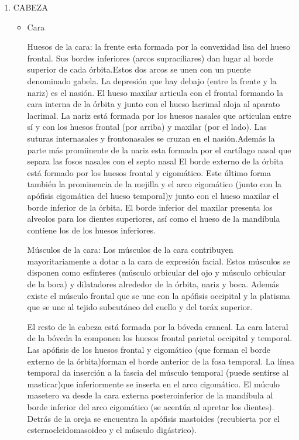 \documentclass[a4paper,12pt]{article} %
\begin{document}
\begin{enumerate} %
\item CABEZA
\begin{itemize} %
\item Cara %

Huesos de la cara: la frente esta formada por la convexidad lisa del hueso frontal. Sus bordes inferiores (arcos supraciliares) dan lugar al borde superior de cada órbita.Estos dos arcos se unen con un puente denominado gabela. La depresión que hay debajo (entre la frente y la nariz) es el nasión.
El hueso maxilar articula con el frontal formando la cara interna de la órbita y junto con el hueso lacrimal aloja al aparato lacrimal.
La nariz  está formada por los huesos nasales que articulan entre sí y con los huesos frontal (por arriba) y maxilar (por el lado). Las suturas internasales y frontonasales se cruzan en el nasión.Además la parte más promiinente de la nariz esta formada por el cartílago nasal que separa las fosos nasales con el septo nasal
El borde externo de la órbita está formado por los huesos frontal y cigomático. Este último forma también la prominencia de la mejilla y el arco cigomático (junto con la apófisis cigomática del hueso temporal)y junto con el hueso maxilar el borde inferior de la órbita.
El borde inferior del maxilar presenta los alveolos para los dientes superiores, así como el hueso de la mandíbula contiene los de los huesos inferiores.

Músculos de la cara: Los músculos de la cara contribuyen mayoritariamente a dotar a la cara de expresión facial. Estos músculos se disponen como esfínteres (músculo orbicular del ojo y músculo orbicular de la boca) y dilatadores alrededor de la órbita, nariz y boca. Además existe el músculo frontal que se une con la apófisis occipital y la platisma que se une al tejido subcutáneo del cuello y del toráx superior.

El resto de la cabeza está formada por la bóveda craneal. La cara lateral de la bóveda la componen los huesos frontal parietal occipital y temporal.
Las apófisis de los huesos frontal y cigomático (que forman el borde externo de la órbita)forman el borde anterior de la fosa temporal. La línea temporal da inserción a la fascia del músculo temporal  (puede sentirse al masticar)que inferiormente se inserta en el arco cigomático.
El múculo masetero va desde la cara externa posteroinferior de la mandíbula al borde inferior del arco cigomático (se acentúa al apretar los dientes).
Detrás de la oreja se encuentra la apófisis mastoides (recubierta por el esternocleidomasoideo y el músculo digástrico).


\end{itemize}
\end{enumerate}
\end{document}
